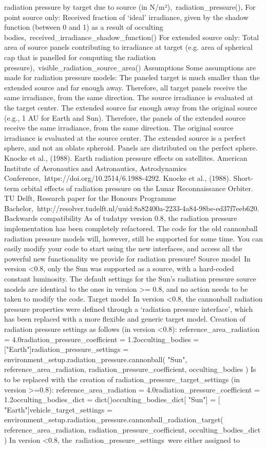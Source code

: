 radiation pressure by target due to source (in N/m²), radiation_pressure(), For point source only: Received fraction of ‘ideal’ irradiance, given by the shadow function (between 0 and 1) as a result of occulting bodies, received_irradiance_shadow_function() For extended source only: Total area of source panels contributing to irradiance at target (e.g. area of spherical cap that is panelled for computing the radiation pressure), visible_radiation_source_area() Assumptions Some assumptions are made for radiation pressure models: The paneled target is much smaller than the extended source and far enough away. Therefore, all target panels receive the same irradiance, from the same direction. The source irradiance is evaluated at the target center. The extended source far enough away from the original source (e.g., 1 AU for Earth and Sun). Therefore, the panels of the extended source receive the same irradiance, from the same direction. The original source irradiance is evaluated at the source center. The extended source is a perfect sphere, and not an oblate spheroid. Panels are distributed on the perfect sphere.  Knocke et al., (1988). Earth radiation pressure effects on satellites. American Institute of Aeronautics and Astronautics, Astrodynamics Conference, https://doi.org/10.2514/6.1988-4292.  Knocke et al., (1988). Short-term orbital effects of radiation pressure on the Lunar Reconnaissance Orbiter. TU Delft, Research paper for the Honours Programme Bachelor, http://resolver.tudelft.nl/uuid:8a82400a-2233-4a84-98be-ed37f7eeb620. Backwards compatibility As of tudatpy version 0.8, the radiation pressure implementation has been completely refactored. The code for the old cannonball radiation pressure models will, however, still be supported for some time. You can easily modify your code to start using the new interfaces, and access all the powerful new functionality we provide for radiation pressure! Source model In version <0.8, only the Sun was supported as a source, with a hard-coded constant luminosity. The default settings for the Sun’s radiation pressure source models are identical to the ones in version >= 0.8, and no action needs to be taken to modify the code. Target model In version <0.8, the cannonball radiation pressure properties were defined through a ‘radiation pressure interface’, which has been replaced with a more flexible and generic target model. Creation of radiation pressure settings as follows (in version <0.8): reference_area_radiation = 4.0radiation_pressure_coefficient = 1.2occulting_bodies = ["Earth"]radiation_pressure_settings = environment_setup.radiation_pressure.cannonball( "Sun", reference_area_radiation, radiation_pressure_coefficient, occulting_bodies ) Is to be replaced with the creation of radiation_pressure_target_settings (in version >=0.8): reference_area_radiation = 4.0radiation_pressure_coefficient = 1.2occulting_bodies_dict = dict()occulting_bodies_dict[ "Sun"] = [ "Earth"]vehicle_target_settings = environment_setup.radiation_pressure.cannonball_radiation_target( reference_area_radiation, radiation_pressure_coefficient, occulting_bodies_dict ) In version <0.8, the radiation_pressure_settings were either assigned to 